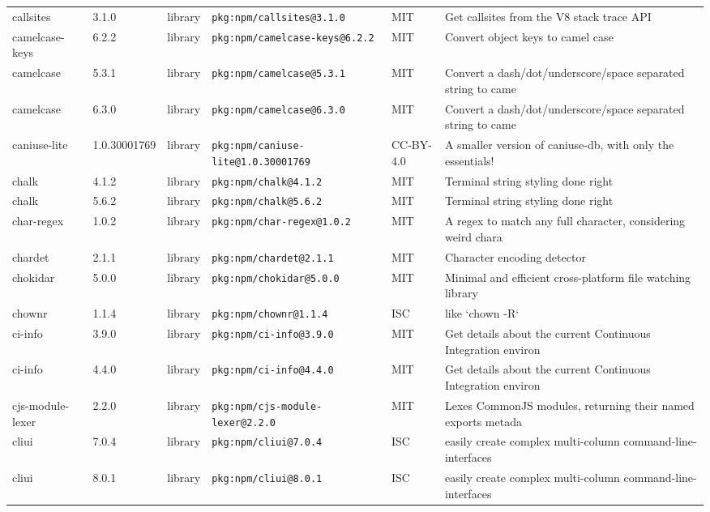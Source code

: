 \documentclass[11pt]{article}
\begin{document}
\begin{longtable}{|l|l|l|p{2.2cm}|l|p{4cm}|}
callsites & 3.1.0 & library & \texttt{pkg:npm/callsites@3.1.0} & MIT & Get callsites from the V8 stack trace API \\
camelcase-keys & 6.2.2 & library & \texttt{pkg:npm/camelcase-keys@6.2.2} & MIT & Convert object keys to camel case \\
camelcase & 5.3.1 & library & \texttt{pkg:npm/camelcase@5.3.1} & MIT & Convert a dash/dot/underscore/space separated string to came \\
camelcase & 6.3.0 & library & \texttt{pkg:npm/camelcase@6.3.0} & MIT & Convert a dash/dot/underscore/space separated string to came \\
caniuse-lite & 1.0.30001769 & library & \texttt{pkg:npm/caniuse-lite@1.0.30001769} & CC-BY-4.0 & A smaller version of caniuse-db, with only the essentials! \\
chalk & 4.1.2 & library & \texttt{pkg:npm/chalk@4.1.2} & MIT & Terminal string styling done right \\
chalk & 5.6.2 & library & \texttt{pkg:npm/chalk@5.6.2} & MIT & Terminal string styling done right \\
char-regex & 1.0.2 & library & \texttt{pkg:npm/char-regex@1.0.2} & MIT & A regex to match any full character, considering weird chara \\
chardet & 2.1.1 & library & \texttt{pkg:npm/chardet@2.1.1} & MIT & Character encoding detector \\
chokidar & 5.0.0 & library & \texttt{pkg:npm/chokidar@5.0.0} & MIT & Minimal and efficient cross-platform file watching library \\
chownr & 1.1.4 & library & \texttt{pkg:npm/chownr@1.1.4} & ISC & like `chown -R` \\
ci-info & 3.9.0 & library & \texttt{pkg:npm/ci-info@3.9.0} & MIT & Get details about the current Continuous Integration environ \\
ci-info & 4.4.0 & library & \texttt{pkg:npm/ci-info@4.4.0} & MIT & Get details about the current Continuous Integration environ \\
cjs-module-lexer & 2.2.0 & library & \texttt{pkg:npm/cjs-module-lexer@2.2.0} & MIT & Lexes CommonJS modules, returning their named exports metada \\
cliui & 7.0.4 & library & \texttt{pkg:npm/cliui@7.0.4} & ISC & easily create complex multi-column command-line-interfaces \\
cliui & 8.0.1 & library & \texttt{pkg:npm/cliui@8.0.1} & ISC & easily create complex multi-column command-line-interfaces \\

\end{longtable}
\end{document}
